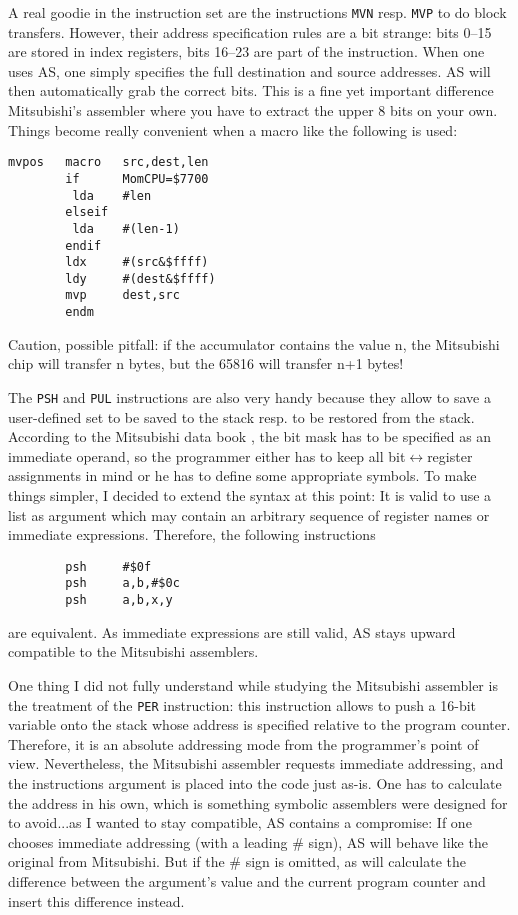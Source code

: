 \documentclass[12pt,twoside]{report}
\newcommand{\tty}[1]{{\tt #1}}
\begin{document}
A real goodie in the instruction set are the instructions \tty{MVN} resp.
\tty{MVP} to do block transfers.  However, their address specification
rules are a bit strange: bits 0--15 are stored in index registers,
bits 16--23 are part of the instruction.  When one uses AS, one
simply specifies the full destination and source addresses.  AS will
then automatically grab the correct bits.  This is a fine yet
important difference  Mitsubishi's assembler where you have to
extract the upper 8 bits on your own.  Things become really
convenient when a macro like the following is used:
\begin{verbatim}
mvpos   macro   src,dest,len
        if      MomCPU=$7700
         lda    #len
        elseif
         lda    #(len-1)
        endif
        ldx     #(src&$ffff)
        ldy     #(dest&$ffff)
        mvp     dest,src
        endm
\end{verbatim}
Caution, possible pitfall: if the accumulator contains the value n,
the Mitsubishi chip will transfer n bytes, but the 65816 will
transfer n+1 bytes!

The \tty{PSH} and \tty{PUL} instructions are also very handy because they
allow to save a user-defined set to be saved to the stack resp. to be
restored from the stack.  According to the Mitsubishi data book
\cite{Mit16}, the bit mask has to be specified as an immediate operand, so
the programmer either has to keep all bit$\leftrightarrow$register
assignments in mind or he has to define some appropriate symbols.  To make
things simpler, I decided to extend the syntax at this point: It is valid
to use a list as argument which may contain an arbitrary sequence of
register names or immediate expressions.  Therefore, the following
instructions
\begin{verbatim}
        psh     #$0f
        psh     a,b,#$0c
        psh     a,b,x,y

\end{verbatim}
are equivalent.  As immediate expressions are still valid, AS stays
upward compatible to the Mitsubishi assemblers.

One thing I did not fully understand while studying the Mitsubishi
assembler is the treatment of the \tty{PER} instruction: this instruction
allows to push a 16-bit variable onto the stack whose address is
specified relative to the program counter.  Therefore, it is an
absolute addressing mode from the programmer's point of view.
Nevertheless, the Mitsubishi assembler requests immediate addressing,
and the instructions argument is placed into the code just as-is.
One has to calculate the address in his own, which is something
symbolic assemblers were designed for to avoid...as I wanted to stay
compatible, AS contains a compromise:  If one chooses immediate
addressing (with a leading \# sign), AS will behave like the original
from Mitsubishi.  But if the \# sign is omitted, as will calculate the
difference between the argument's value and the current program
counter and insert this difference instead.
\end{document}
